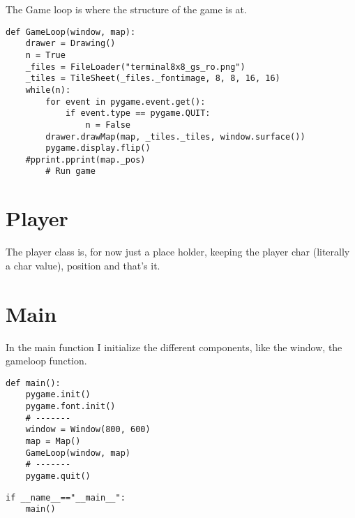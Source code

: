\documentclass[11pt]{article}
\begin{document}
The Game loop is where the structure of the game is at.

\begin{verbatim}
def GameLoop(window, map):
    drawer = Drawing()
    n = True
    _files = FileLoader("terminal8x8_gs_ro.png")
    _tiles = TileSheet(_files._fontimage, 8, 8, 16, 16)
    while(n):
        for event in pygame.event.get():
            if event.type == pygame.QUIT:
                n = False
        drawer.drawMap(map, _tiles._tiles, window.surface())
        pygame.display.flip()
    #pprint.pprint(map._pos)
        # Run game
\end{verbatim}

\section{Player}
\label{sec:orgb17c10d}

The player class is, for now just a place holder, keeping the player char (literally a char value), position and that's it.


\section{Main}
\label{sec:orgd25be79}

In the main function I initialize the different components, like the window, the gameloop function.

\begin{verbatim}
def main():
    pygame.init()
    pygame.font.init()
    # -------
    window = Window(800, 600)
    map = Map()
    GameLoop(window, map)
    # -------
    pygame.quit()
\end{verbatim}



\begin{verbatim}
if __name__=="__main__":
    main()
\end{verbatim}
\end{document}
